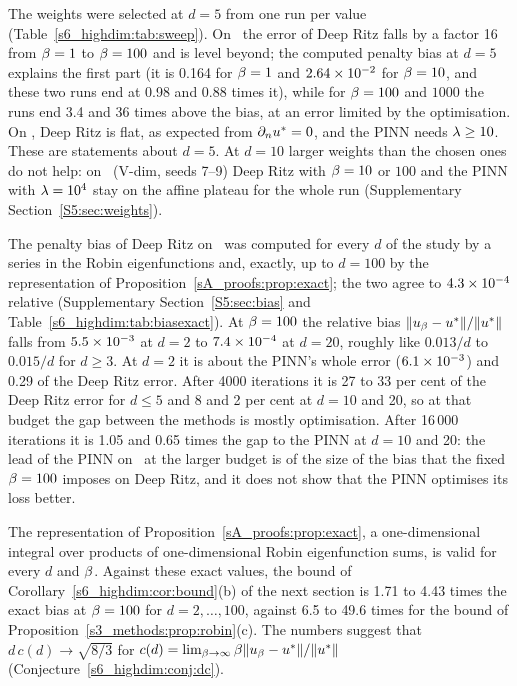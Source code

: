 The weights were selected at $d=5$ from one run per value (Table~\ref{s6_highdim:tab:sweep}).
On \Pone\ the error of Deep Ritz falls by a factor 16 from $\beta=1$ to $\beta=100$ and is level
beyond; the computed penalty bias at $d=5$ explains the first part (it is 0.164 for $\beta=1$
and $2.64\times 10^{-2}$ for $\beta=10$, and these two runs end at 0.98 and 0.88 times it), while
for $\beta=100$ and $1000$ the runs end 3.4 and 36 times above the bias, at an error limited by
the optimisation. On \Ptwo, Deep Ritz is flat, as expected from $\partial_nu^{*}=0$, and the PINN needs
$\lambda\ge10$.
These are statements about $d=5$. At $d=10$ larger weights than the chosen ones do not help:
on \Ptwo\ (\textsf{V-dim}, seeds 7--9) Deep Ritz with $\beta=10$ or $100$ and the PINN with
$\lambda=10^4$ stay on the affine plateau for the whole run (Supplementary
Section~\ref{S5:sec:weights}).

The penalty bias of Deep Ritz on \Pone\ was computed for every $d$ of the study by a series in
the Robin eigenfunctions and, exactly, up to $d=100$ by the representation of
Proposition~\ref{sA_proofs:prop:exact};
the two agree to $4.3\times 10^{-4}$ relative (Supplementary Section~\ref{S5:sec:bias} and
Table~\ref{s6_highdim:tab:biasexact}). At $\beta=100$ the relative bias $\lVert u_{\beta}-u^{*}\rVert/\lVert u^{*}\rVert$
falls from $5.5\times 10^{-3}$ at $d=2$ to $7.4\times 10^{-4}$ at $d=20$, roughly like $0.013/d$ to
$0.015/d$ for $d\ge3$. At $d=2$ it is about the PINN's whole error ($6.1\times 10^{-3}$) and 0.29 of
the Deep Ritz error. After 4000 iterations it is 27 to 33 per cent of the Deep Ritz error for
$d\le5$ and 8 and 2 per cent at $d=10$ and 20, so at that budget the gap between the methods is
mostly optimisation. After 16\,000 iterations it is 1.05 and 0.65 times the gap to the PINN at
$d=10$ and 20: the lead of the PINN on \Pone\ at the larger budget is of the size of the bias
that the fixed $\beta=100$ imposes on Deep Ritz, and it does not show that the PINN optimises
its loss better.

The representation of Proposition~\ref{sA_proofs:prop:exact}, a one-dimensional integral over
products of one-dimensional Robin eigenfunction sums, is valid for every $d$ and $\beta$. Against
these exact values, the bound of Corollary~\ref{s6_highdim:cor:bound}(b) of the next section is 1.71 to 4.43 times the exact bias at
$\beta=100$ for $d=2,\dots,100$, against 6.5 to 49.6 times for the bound of
Proposition~\ref{s3_methods:prop:robin}(c). The numbers suggest that $d\,c(d)\to\sqrt{8/3}$ for
$c(d)=\lim_{\beta\to\infty}\beta\lVert u_{\beta}-u^{*}\rVert/\lVert u^{*}\rVert$
(Conjecture~\ref{s6_highdim:conj:dc}).



